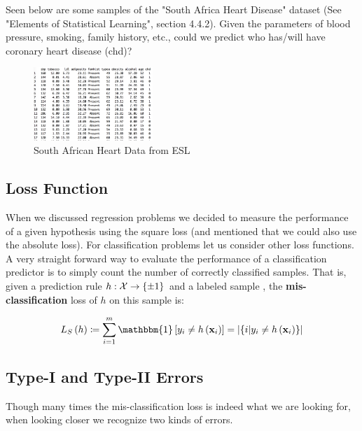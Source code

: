 \begin{example}
	Seen below are some samples of the "South Africa Heart Disease" dataset (See "Elements of Statistical Learning", section 4.4.2). Given the parameters of blood pressure, smoking, family history, etc., could we predict who has/will have coronary heart disease (chd)?
	\begin{figure}[h!]
		\centering
		\includegraphics[width=0.4\textwidth]{chapters/classification/figures/SAheart_data.png}
		\caption{South African Heart Data from ESL}
	\end{figure}
\end{example}

\subsection{Loss Function}
When we discussed regression problems we decided to measure the performance of a given hypothesis using the square loss (and mentioned that we could also use the absolute loss). For classification problems let us consider other loss functions. A very straight forward way to evaluate the performance of a classification predictor is to simply count the number of correctly classified samples. That is, given a prediction rule $h:\mathcal{X}\rightarrow \left\{\pm 1\right\}$ and a labeled sample \trainset, the \textbf{mis-classification} loss of $h$ on this sample is:

\begin{equation}
L_S\left(h\right)\coloneqq\sum^{m}_{i=1}\mathbbm{1}\left[y_i\neq h\left(\x_i\right)\right]=\left|\left\{i|y_i\neq h\left(\x_i\right)\right\}\right|
\label{eqn:misclass_loss}
\end{equation}

\subsection{Type-I and Type-II Errors}\label{error_types}
Though many times the mis-classification loss is indeed what we are looking for, when looking closer we recognize two kinds of errors.

